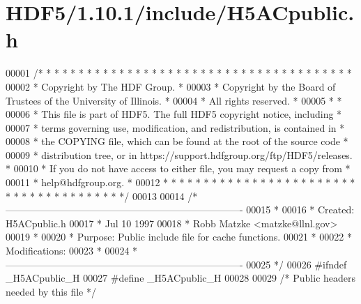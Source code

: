 \hypertarget{_h_d_f5_21_810_81_2include_2_h5_a_cpublic_8h_source}{}\section{H\+D\+F5/1.10.1/include/\+H5\+A\+Cpublic.h}
\label{_h_d_f5_21_810_81_2include_2_h5_a_cpublic_8h_source}

\begin{DoxyCode}
00001 \textcolor{comment}{/* * * * * * * * * * * * * * * * * * * * * * * * * * * * * * * * * * * * * * *}
00002 \textcolor{comment}{ * Copyright by The HDF Group.                                               *}
00003 \textcolor{comment}{ * Copyright by the Board of Trustees of the University of Illinois.         *}
00004 \textcolor{comment}{ * All rights reserved.                                                      *}
00005 \textcolor{comment}{ *                                                                           *}
00006 \textcolor{comment}{ * This file is part of HDF5.  The full HDF5 copyright notice, including     *}
00007 \textcolor{comment}{ * terms governing use, modification, and redistribution, is contained in    *}
00008 \textcolor{comment}{ * the COPYING file, which can be found at the root of the source code       *}
00009 \textcolor{comment}{ * distribution tree, or in https://support.hdfgroup.org/ftp/HDF5/releases.  *}
00010 \textcolor{comment}{ * If you do not have access to either file, you may request a copy from     *}
00011 \textcolor{comment}{ * help@hdfgroup.org.                                                        *}
00012 \textcolor{comment}{ * * * * * * * * * * * * * * * * * * * * * * * * * * * * * * * * * * * * * * */}
00013 
00014 \textcolor{comment}{/*-------------------------------------------------------------------------}
00015 \textcolor{comment}{ *}
00016 \textcolor{comment}{ * Created:             H5ACpublic.h}
00017 \textcolor{comment}{ *                      Jul 10 1997}
00018 \textcolor{comment}{ *                      Robb Matzke <matzke@llnl.gov>}
00019 \textcolor{comment}{ *}
00020 \textcolor{comment}{ * Purpose:             Public include file for cache functions.}
00021 \textcolor{comment}{ *}
00022 \textcolor{comment}{ * Modifications:}
00023 \textcolor{comment}{ *}
00024 \textcolor{comment}{ *-------------------------------------------------------------------------}
00025 \textcolor{comment}{ */}
00026 \textcolor{preprocessor}{#ifndef \_H5ACpublic\_H}
00027 \textcolor{preprocessor}{#define \_H5ACpublic\_H}
00028 
00029 \textcolor{comment}{/* Public headers needed by this file */}

\end{DoxyCode}
